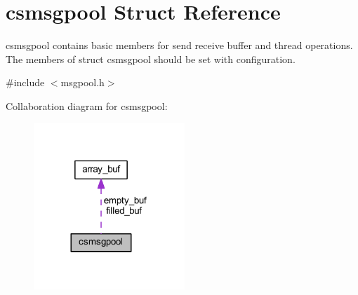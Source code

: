 \hypertarget{structcsmsgpool}{}\section{csmsgpool Struct Reference}
\label{structcsmsgpool}


csmsgpool contains basic members for send receive buffer and thread operations. The members of struct csmsgpool should be set with configuration.  




{\ttfamily \#include $<$msgpool.\+h$>$}



Collaboration diagram for csmsgpool\+:
\nopagebreak
\begin{figure}[H]
\begin{center}
\leavevmode
\includegraphics[width=161pt]{structcsmsgpool__coll__graph}
\end{center}
\end{figure}
